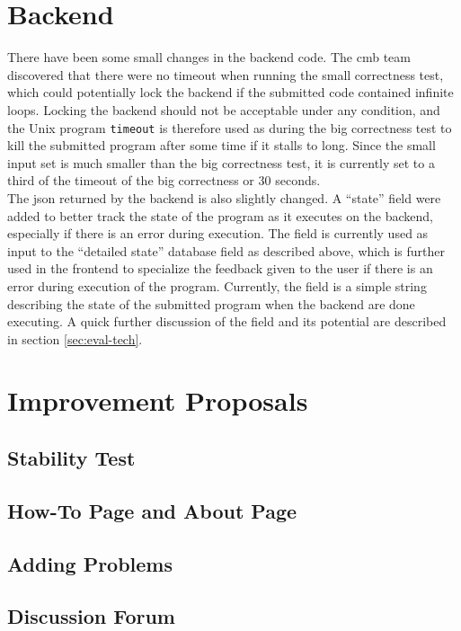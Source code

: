 \section{Backend}
There have been some small changes in the backend code. The \gls{cmb} team discovered that there were no timeout when running the small correctness test, which could potentially lock the backend if the submitted code contained infinite loops. Locking the backend should not be acceptable under any condition, and the Unix program \texttt{timeout} \cite{TIMEOUT} is therefore used as during the big correctness test to kill the submitted program after some time if it stalls to long. Since the small input set is much smaller than the big correctness test, it is currently set to a third of the timeout of the big correctness or 30 seconds. \\

The \gls{json} returned by the backend is also slightly changed. A ``state'' field were added to better track the state of the program as it executes on the backend, especially if there is an error during execution. The field is currently used as input to the ``detailed state'' database field as described above, which is further used in the frontend to specialize the feedback given to the user if there is an error during execution of the program. Currently, the field is a simple string describing the state of the submitted program when the backend are done executing. A quick further discussion of the field and its potential are described in section \ref{sec:eval-tech}.

\section{Improvement Proposals}

\subsection{Stability Test}

\subsection{How-To Page and About Page}

\subsection{Adding Problems}

\subsection{Discussion Forum}
